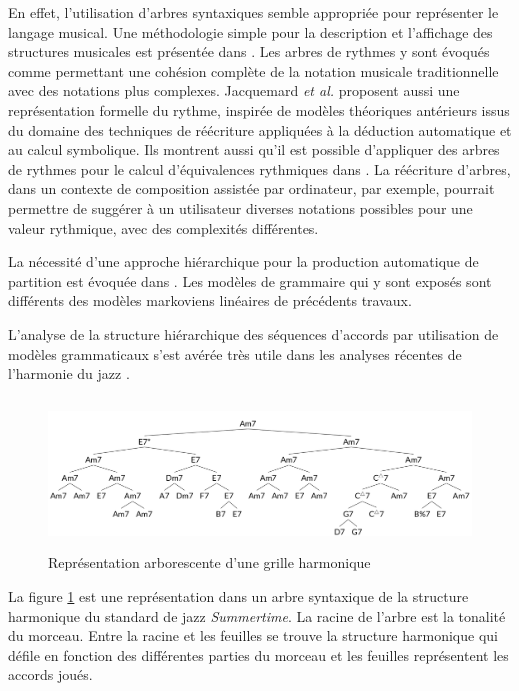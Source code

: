 En effet, l’utilisation d’arbres syntaxiques semble appropriée pour représenter
le langage musical. Une méthodologie simple pour la description et l’affichage
des structures musicales est présentée dans \cite{rythm_tree}. Les arbres de
rythmes y sont évoqués comme permettant une cohésion complète de la notation
musicale traditionnelle avec des notations plus complexes. Jacquemard
\textit{et al.} \cite{jacquemard_1} proposent aussi une représentation
formelle du rythme, inspirée de modèles théoriques antérieurs issus du domaine
des techniques de réécriture appliquées à la déduction automatique et au calcul
symbolique. Ils montrent aussi qu’il est possible d’appliquer des arbres de
rythmes pour le calcul d’équivalences rythmiques dans
\cite{jacquemard_2}. La réécriture d’arbres, dans un contexte de
composition assistée par ordinateur, par exemple, pourrait permettre de
suggérer à un utilisateur diverses notations possibles pour une valeur
rythmique, avec des complexités différentes.

La nécessité d’une approche hiérarchique pour la production automatique de
partition est évoquée dans \cite{foscarin}. 
Les modèles de grammaire qui y sont exposés sont différents des modèles
markoviens linéaires de précédents travaux.

L’analyse de la structure hiérarchique des séquences d’accords par utilisation
de modèles grammaticaux s’est avérée très utile dans les analyses récentes de
l’harmonie du jazz \cite{harasimjazz}. 


\begin{figure}[h]
	\centering
	\includegraphics[height=40mm, width=120mm]{
    z_images/2_etat_de_l_art/1_summertime_tree.png}
    \caption{Représentation arborescente d’une grille harmonique
    \protect\cite{harasimjazz}}
    \label{arbre_harmo}
\end{figure}

La figure \ref{arbre_harmo} est une représentation dans un arbre syntaxique de
la structure harmonique du standard de jazz \textit{Summertime}. La racine de l’arbre
est la tonalité du morceau. Entre la racine et les feuilles se trouve la
structure harmonique qui défile en fonction des différentes parties du morceau
et les feuilles représentent les accords joués.

